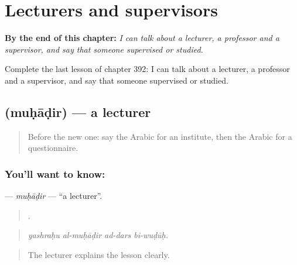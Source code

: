 
\chapter{Lecturers and supervisors}
\label{ch:ar-lecturers-and-supervisors}

\begin{chapteropening}
\textbf{By the end of this chapter:} \emph{I can talk about a lecturer, a professor and a supervisor, and say that someone supervised or studied.}

Complete the last lesson of chapter 392: I can talk about a lecturer, a professor and a supervisor, and say that someone supervised or studied.
\end{chapteropening}

\section[\texorpdfstring{\ar{محاضر} (muḥāḍir)}{محاضر (muḥāḍir)}]{ (muḥāḍir) — a lecturer}

\label{lesson:AR-C392-muhadir}



\begin{quote}
Before the new one: say the Arabic for an institute, then the Arabic for a questionnaire.
\end{quote}

\subsection*{You'll want to know: }
\textbf{} — \emph{muḥāḍir} — \textquotedblleft{}a lecturer\textquotedblright{}.

\begin{quote}
   .
\end{quote}

\begin{quote}
\emph{yashraḥu al-muḥāḍir ad-dars bi-wuḍūḥ.}
\end{quote}

\begin{quote}
The lecturer explains the lesson clearly.
\end{quote}

